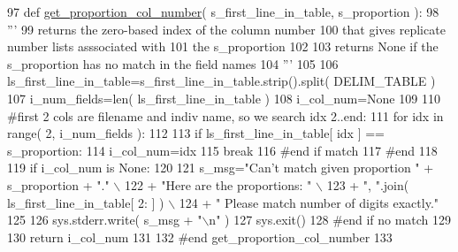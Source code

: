 \begin{DoxyCode}
97 \textcolor{keyword}{def }\hyperlink{namespacenegui_1_1indiv_ae7fb810142ce304fc6d7c59e8062d1a5}{get\_proportion\_col\_number}( s\_first\_line\_in\_table, s\_proportion ):
98     \textcolor{stringliteral}{'''}
99 \textcolor{stringliteral}{    returns the zero-based index of the column number}
100 \textcolor{stringliteral}{    that gives replicate number lists asssociated with}
101 \textcolor{stringliteral}{    the s\_proportion}
102 \textcolor{stringliteral}{}
103 \textcolor{stringliteral}{    returns None if the s\_proportion has no match in the field names}
104 \textcolor{stringliteral}{    '''}
105 
106     ls\_first\_line\_in\_table=s\_first\_line\_in\_table.strip().split( DELIM\_TABLE )
107     i\_num\_fields=len( ls\_first\_line\_in\_table )
108     i\_col\_num=\textcolor{keywordtype}{None}
109 
110     \textcolor{comment}{#first 2 cols are filename and indiv name, so we search idx 2..end:}
111     \textcolor{keywordflow}{for} idx \textcolor{keywordflow}{in} range( 2, i\_num\_fields ):
112 
113         \textcolor{keywordflow}{if} ls\_first\_line\_in\_table[ idx ] == s\_proportion:
114             i\_col\_num=idx
115             \textcolor{keywordflow}{break}
116         \textcolor{comment}{#end if match}
117     \textcolor{comment}{#end}
118 
119     \textcolor{keywordflow}{if} i\_col\_num \textcolor{keywordflow}{is} \textcolor{keywordtype}{None}:
120 
121         s\_msg=\textcolor{stringliteral}{"Can't match given proportion "} + s\_proportion + \textcolor{stringliteral}{"."} \(\backslash\)
122                 + \textcolor{stringliteral}{"Here are the proportions: "} \(\backslash\)
123                 + \textcolor{stringliteral}{", "}.join( ls\_first\_line\_in\_table[ 2: ] ) \(\backslash\)
124                 + \textcolor{stringliteral}{"  Please match number of digits exactly."}
125             
126         sys.stderr.write( s\_msg + \textcolor{stringliteral}{"\(\backslash\)n"} )
127         sys.exit()
128     \textcolor{comment}{#end if no match}
129 
130     \textcolor{keywordflow}{return} i\_col\_num 
131 
132 \textcolor{comment}{#end get\_proportion\_col\_number}
133 
\end{DoxyCode}
